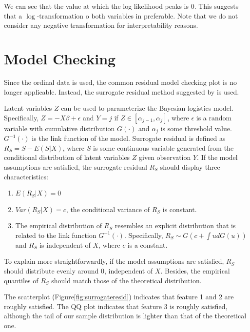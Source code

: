 \documentclass[10pt]{jmlr}%
\begin{document}
We can see that the value at which the log likelihood peaks is 0. This suggests that a $\log$-transformation o  both variables in preferable. Note that we do not consider any negative transformation for interpretability reasons. 

\section{Model Checking}

Since the ordinal data is used, the common residual model checking plot is no longer applicable. Instead, the surrogate residual method suggested by \cite{Liu2018} is used. 

Latent variables $Z$ can be used to parameterize the Bayesian logistics model. Specifically, $Z=-X\beta+\epsilon$ and $Y=j$ if $Z\in[\alpha_{j-1},\alpha_{j}]$, where $\epsilon$ is a random variable with cumulative distribution $G(\cdot)$ and $\alpha_{j}$ is some threshold value. $G^{-1}(\cdot)$ is the link function of the model. Surrogate residual is defined as $R_S=S-E(S|X)$, where $S$ is some continuous variable generated from the conditional distribution of latent variables $Z$ given observation $Y$. If the model assumptions are satisfied, the surrogate residual $R_S$ should display three characteristics: 

\begin{enumerate}
	\item $E(R_S|X)=0$
	\item $Var(R_S|X)=c$, the conditional variance of $R_S$ is constant.
	\item The empirical distribution of $R_S$ resembles an explicit distribution that is related to the link function $G^{-1}(\cdot)$. Specifically, $R_S\sim G(c+\int ud G(u))$ and $R_S$ is independent of $X$, where $c$ is a constant.
\end{enumerate}

To explain more straightforwardly, if the model assumptions are satisfied, $R_S$ should distribute evenly around 0, independent of $X$. Besides, the empirical quantiles of $R_S$  should match those of the theoretical distribution.

The scatterplot (Figure\ref{fig:surrogateresid}) indicates that feature 1 and 2 are roughly satisfied. The QQ plot indicates that feature 3 is roughly satisfied, although the tail of our sample distribution is lighter than that of the theoretical one. 
\end{document}
